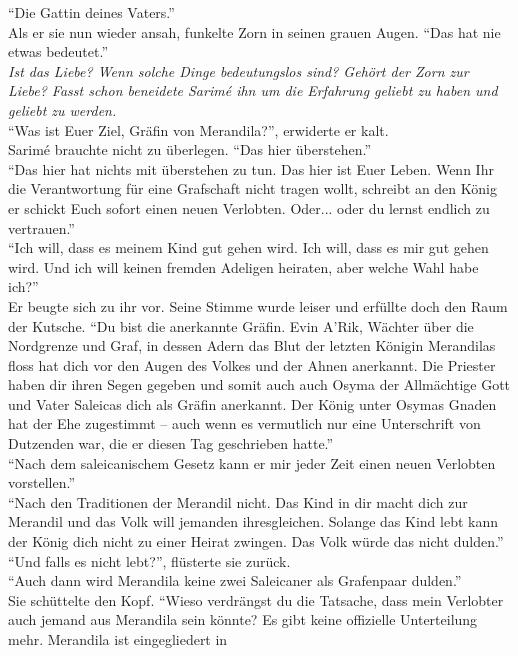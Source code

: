 ``Die Gattin deines Vaters.''\\
Als er sie nun wieder ansah, funkelte Zorn in seinen grauen Augen. ``Das hat nie etwas bedeutet.''\\
\textit{Ist das Liebe? Wenn solche Dinge bedeutungslos sind? Gehört der Zorn zur Liebe?
Fasst schon beneidete Sarimé ihn um die Erfahrung geliebt zu haben und geliebt zu werden.}\\
``Was ist Euer Ziel, Gräfin von Merandila?'', erwiderte er kalt.\\
Sarimé brauchte nicht zu überlegen. ``Das hier überstehen.''\\
``Das hier hat nichts mit überstehen zu tun. Das hier ist Euer Leben. Wenn Ihr die Verantwortung 
für 
eine Grafschaft nicht tragen wollt, schreibt an den König er schickt Euch sofort einen neuen 
Verlobten. Oder... oder du lernst endlich zu vertrauen.''\\
``Ich will, dass es meinem Kind gut gehen wird. Ich will, dass es mir gut gehen wird. Und ich will 
keinen fremden Adeligen heiraten, aber welche Wahl habe ich?''\\
Er beugte sich zu ihr vor. Seine Stimme wurde leiser und erfüllte doch den Raum der Kutsche. ``Du 
bist die anerkannte Gräfin. Evin A'Rik, Wächter über die Nordgrenze und Graf, in dessen Adern das 
Blut der letzten Königin Merandilas floss hat dich vor den Augen des Volkes und der Ahnen 
anerkannt. 
Die Priester haben dir ihren Segen gegeben und somit auch auch Osyma der Allmächtige Gott und Vater 
Saleicas dich als Gräfin anerkannt. Der König unter Osymas Gnaden hat der Ehe zugestimmt – auch 
wenn 
es vermutlich nur eine Unterschrift von Dutzenden war, die er diesen Tag geschrieben hatte.''\\
``Nach dem saleicanischem Gesetz kann er mir jeder Zeit einen neuen Verlobten vorstellen.''\\
``Nach den Traditionen der Merandil nicht. Das Kind in dir macht dich zur Merandil und das Volk 
will 
jemanden ihresgleichen. Solange das Kind lebt kann der König dich nicht zu einer Heirat zwingen. 
Das 
Volk würde das nicht dulden.''\\
``Und falls es nicht lebt?'', flüsterte sie zurück.\\
``Auch dann wird Merandila keine zwei Saleicaner als Grafenpaar dulden.''\\
Sie schüttelte den Kopf. ``Wieso verdrängst du die Tatsache, dass mein Verlobter auch jemand aus 
Merandila sein könnte? Es gibt keine offizielle Unterteilung mehr. Merandila ist eingegliedert in 

